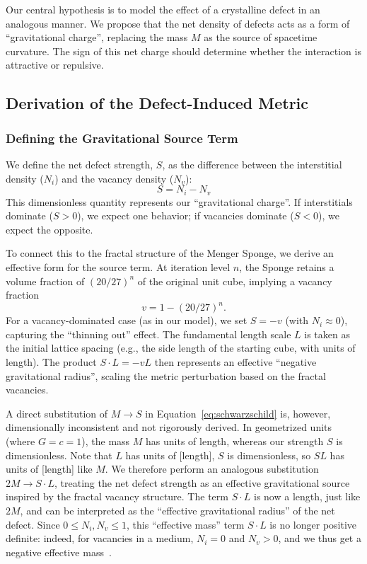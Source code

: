 \documentclass[%
  reprint,
  superscriptaddress,
  showpacs,
  showkeys,
  amsmath,amssymb,
  pra,
  longbibliography,
  floatfix,
  x11names
]{revtex4-2}
\begin{document}
Our central hypothesis is to model the effect of a crystalline defect in an analogous manner. We propose that the net density of defects acts as a form of ``gravitational charge'', replacing the mass $M$ as the source of spacetime curvature. The sign of this net charge should determine whether the interaction is attractive or repulsive.

\subsection{Derivation of the Defect-Induced Metric}

\subsubsection{Defining the Gravitational Source Term}

We define the net defect strength, $S$, as the difference between the interstitial density ($N_i$) and the vacancy density ($N_v$):
\begin{equation}
S = N_i - N_v
\end{equation}
This dimensionless quantity represents our ``gravitational charge''. If interstitials dominate ($S>0$), we expect one behavior; if vacancies dominate ($S<0$), we expect the opposite.

To connect this to the fractal structure of the Menger Sponge, we derive an effective form for the source term. At iteration level $n$, the Sponge retains a volume fraction of $(20/27)^n$ of the original unit cube, implying a vacancy fraction
\begin{equation}
v = 1 - (20/27)^n.
\end{equation}
For a vacancy-dominated case (as in our model), we set $S = -v$ (with $N_i \approx 0$), capturing the ``thinning out'' effect. The fundamental length scale $L$ is taken as the initial lattice spacing (e.g., the side length of the starting cube, with units of length). The product $S \cdot L = -v L$ then represents an effective ``negative gravitational radius'', scaling the metric perturbation based on the fractal vacancies.

A direct substitution of $M \to S$ in Equation~\ref{eq:schwarzschild} is, however, dimensionally inconsistent and not rigorously derived. In geometrized units (where $G=c=1$), the mass $M$ has units of length, whereas our strength $S$ is dimensionless. Note that $L$ has units of [length], $S$ is dimensionless, so $S L$ has units of [length] like $M$. We therefore perform an analogous substitution $2M \longrightarrow S \cdot L$, treating the net defect strength as an effective gravitational source inspired by the fractal vacancy structure. The term $S \cdot L$ is now a length, just like $2M$, and can be interpreted as the ``effective gravitational radius'' of the net defect. Since $0 \le N_i, N_v \le 1$, this ``effective mass'' term $S \cdot L$ is no longer positive definite: indeed, for vacancies in a medium, $N_i=0$ and $N_v > 0$, and we thus get a negative effective mass~\cite{bondi-1957}.
\end{document}
